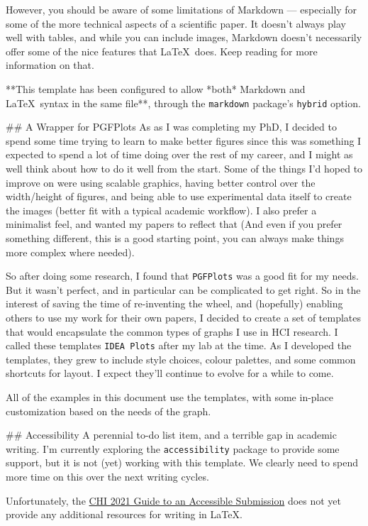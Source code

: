 \begin{markdown}
However, you should be aware of some limitations of Markdown --- especially for some of the more technical aspects of a scientific paper. It doesn't always play well with tables, and while you can include images, Markdown doesn't necessarily offer some of the nice features that \LaTeX\ does. Keep reading for more information on that. 

**This template has been configured to allow *both* Markdown and \LaTeX\ syntax in the same file**, through the \texttt{markdown} package's \texttt{hybrid} option.



## A Wrapper for PGFPlots
As as I was completing my PhD, I decided to spend some time trying to learn to make better figures since this was something I expected to spend a lot of time doing over the rest of my career, and I might as well think about how to do it well from the start. Some of the things I'd hoped to improve on were using scalable graphics, having better control over the width/height of figures, and being able to use experimental data itself to create the images (better fit with a typical academic workflow). I also prefer a minimalist feel, and wanted my papers to reflect that (And even if you prefer something different, this is a good starting point, you can always make things more complex where needed). 

So after doing some research, I found that \texttt{PGFPlots} was a good fit for my needs. But it wasn't perfect, and in particular can be complicated to get right. So in the interest of saving the time of re-inventing the wheel, and (hopefully) enabling others to use my work for their own papers, I decided to create a set of templates that would encapsulate the common types of graphs I use in HCI research. I called these templates \texttt{IDEA Plots} after my lab at the time. As I developed the templates, they grew to include style choices, colour palettes, and some common shortcuts for layout. I expect they'll continue to evolve for a while to come.  

All of the examples in this document use the templates, with some in-place customization based on the needs of the graph. 



## Accessibility
A perennial to-do list item, and a terrible gap in academic writing. I'm currently exploring the \texttt{accessibility} package to provide some support, but it is not (yet) working with this template. We clearly need to spend more time on this over the next writing cycles.

Unfortunately, the \href{https://chi2021.acm.org/for-authors/presenting/papers/guide-to-an-accessible-submission}{CHI 2021 Guide to an Accessible Submission} does not yet provide any additional resources for writing in \LaTeX. 


\end{markdown}